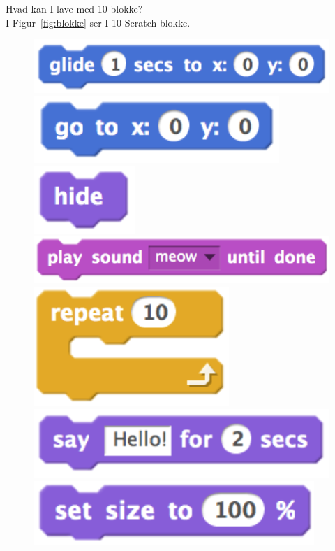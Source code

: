 Hvad kan I lave med 10 blokke?\\
I Figur~\ref{fig:blokke} ser I 10 Scratch blokke.
\begin{figure}
  \centering
  \includegraphics[height=0.04\paperheight]{figures/glide.png}
  \includegraphics[height=0.04\paperheight]{figures/go.png}
  \includegraphics[height=0.04\paperheight]{figures/hide.png}
  \includegraphics[height=0.04\paperheight]{figures/playSound.png}
  \includegraphics[height=0.08\paperheight]{figures/repeat.png}
  \includegraphics[height=0.045\paperheight]{figures/say.png}
  \includegraphics[height=0.04\paperheight]{figures/setSize.png}

\end{figure}
